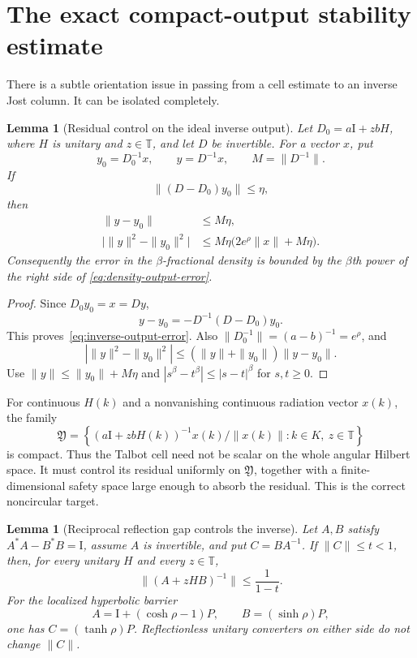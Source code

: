 \documentclass[11pt]{article}
\newtheorem{lemma}[theorem]{Lemma}
\theoremstyle{remark}
\newcommand{\T}{\mathbb T}
\newcommand{\Id}{\mathrm I}
\begin{document}
\section{The exact compact-output stability estimate}

There is a subtle orientation issue in passing from a cell estimate to an
inverse Jost column.  It can be isolated completely.

\begin{lemma}[Residual control on the ideal inverse output]
\label{lem:compact-output-stability}
Let $D_0=a\Id+zbH$, where $H$ is unitary and $z\in\T$, and let $D$ be
invertible.  For a vector $x$, put
\[
 y_0=D_0^{-1}x,\qquad y=D^{-1}x,
 \qquad M=\|D^{-1}\|.
\]
If
\begin{equation}
 \|(D-D_0)y_0\|\leq\eta,
 \label{eq:residual-control}
\end{equation}
then
\begin{align}
 \|y-y_0\|&\leq M\eta,                              \label{eq:inverse-output-error}\\
 \bigl|\|y\|^2-\|y_0\|^2\bigr|
 &\leq M\eta\bigl(2e^\rho\|x\|+M\eta\bigr).
 \label{eq:density-output-error}
\end{align}
Consequently the error in the $\beta$-fractional density is bounded by the
$\beta$th power of the right side of
\eqref{eq:density-output-error}.
\end{lemma}

\begin{proof}
Since $D_0y_0=x=Dy$,
\[
 y-y_0=-D^{-1}(D-D_0)y_0.
\]
This proves~\eqref{eq:inverse-output-error}.  Also
$\|D_0^{-1}\|=(a-b)^{-1}=e^\rho$, and
\[
 |\|y\|^2-\|y_0\|^2|
 \leq(\|y\|+\|y_0\|)\|y-y_0\|.
\]
Use $\|y\|\leq\|y_0\|+M\eta$ and
$|s^\beta-t^\beta|\leq|s-t|^\beta$ for $s,t\geq0$.
\end{proof}

For continuous $H(k)$ and a nonvanishing continuous radiation vector $x(k)$,
the family
\begin{equation}
 \mathfrak Y=\left\{
  (a\Id+zbH(k))^{-1}x(k)/\|x(k)\|:
  k\in K,\ z\in\T
 \right\}
 \label{eq:compact-ideal-output-bundle}
\end{equation}
is compact.  Thus the Talbot cell need not be scalar on the whole angular
Hilbert space.  It must control its residual uniformly on
$\mathfrak Y$, together with a finite-dimensional safety space large enough
to absorb the residual.  This is the correct noncircular target.

\begin{lemma}[Reciprocal reflection gap controls the inverse]
\label{lem:reflection-gap}
Let $A,B$ satisfy $A^*A-B^*B=\Id$, assume $A$ is invertible, and put
$C=BA^{-1}$.  If $\|C\|\leq t<1$, then, for every unitary $H$ and every
$z\in\T$,
\begin{equation}
 \|(A+zHB)^{-1}\|\leq\frac1{1-t}.
 \label{eq:reflection-gap-inverse}
\end{equation}
For the localized hyperbolic barrier
\[
 A=\Id+(\cosh\rho-1)P,\qquad B=(\sinh\rho)P,
\]
one has $C=(\tanh\rho)P$.  Reflectionless unitary converters on either side
do not change $\|C\|$.
\end{lemma}
\end{document}

